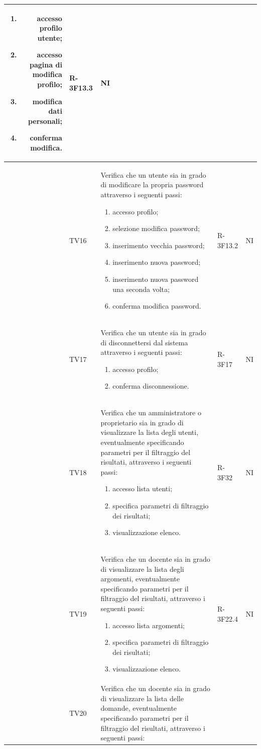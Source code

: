 \documentclass[12pt,a4paper]{article}
\begin{document}
\begin{longtable}{r l p{6cm} l l}
		\begin{enumerate}
			\item accesso profilo utente;
			\item accesso pagina di modifica profilo;
			\item modifica dati personali;
			\item conferma modifica.
		\end{enumerate} & R-3F13.3 & NI\tabularnewline
		\midrule
		& TV16 & Verifica che un utente sia in grado di modificare la propria password attraverso i seguenti passi:
		
		\begin{enumerate}
			\item accesso profilo;
			\item selezione modifica password;
			\item inserimento vecchia password;
			\item inserimento nuova password;
			\item inserimento nuova password una seconda volta;
			\item conferma modifica password.
		\end{enumerate} & R-3F13.2 & NI\tabularnewline
		\midrule
		& TV17 & Verifica che un utente sia in grado di disconnettersi dal sistema attraverso i seguenti passi:
		
		\begin{enumerate}
			\item accesso profilo;
			\item conferma disconnessione.
		\end{enumerate} & R-3F17 & NI\tabularnewline
		\midrule
		& TV18 & Verifica che un amministratore o proprietario sia in grado di visualizzare la lista degli utenti, eventualmente specificando parametri per il filtraggio del risultati, attraverso i seguenti passi:
		
		\begin{enumerate}
			\item accesso lista utenti;
			\item specifica parametri di filtraggio dei risultati;
			\item visualizzazione elenco.
		\end{enumerate} & R-3F32 & NI\tabularnewline
		\midrule
		& TV19 & Verifica che un docente sia in grado di visualizzare la lista degli argomenti, eventualmente specificando parametri per il filtraggio del risultati, attraverso i seguenti passi:
		
		\begin{enumerate}
			\item accesso lista argomenti;
			\item specifica parametri di filtraggio dei risultati;
			\item visualizzazione elenco.
		\end{enumerate} & R-3F22.4 & NI\tabularnewline
		\midrule
		& TV20 & Verifica che un docente sia in grado di visualizzare la lista delle domande, eventualmente specificando parametri per il filtraggio del risultati, attraverso i seguenti passi:
		

\end{longtable}
\end{document}
